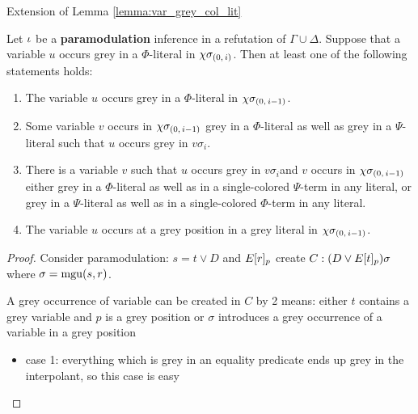 \documentclass[,%
	draft=false,%
	numbers=noendperiod
	12pt,
	a4paper,
	oneside,%
	openany,
]{memoir}
\newcommand{\inv}{\ensuremath{\chi}}
\begin{document}
Extension of Lemma \ref{lemma:var_grey_col_lit}
	
\begin{lemma}
	\label{lemma:var_grey_col_lit_paramod}
	Let $\iota$ be a \textbf{paramodulation} inference in a refutation of $\Gamma\cup\Delta$.
	Suppose that a variable $u$ occurs grey in a $\Phi$-literal in $\inv\sigmazi$.
	Then at least one of the following statements holds:
	\begin{enumerate}
		\item
			\label{11_1}
			The variable $u$ occurs grey in a $\Phi$-literal in $\inv\sigmazmi$.

		\item 
			\label{11_2}
			Some variable $v$ occurs in $\inv\sigmazmi$ grey in a $\Phi$-literal as well as grey in a $\Psi$-literal such that $u$ occurs grey in $v\sigma_i$.

		\item 
			\label{11_3}
			There is a variable $v$ such that $u$ occurs grey in $v\sigma_i$\footnotemark and $v$ occurs in $\inv\sigmazmi$
			either grey in a $\Phi$-literal as well as in a single-colored $\Psi$-term in any literal, 
			or grey in a $\Psi$-literal as well as in a single-colored $\Phi$-term in any literal.

		\item
			\label{11_4}
			The variable $u$ occurs at a grey position in a grey literal in $\inv\sigmazmi$.

	\end{enumerate}
\end{lemma}
\begin{proof}
	Consider paramodulation: $s=t \lor D$ and $E{[r]_{p}}$ create $C: (D\lor E{[t]_{p}})\sigma$ where $\sigma = \operatorname{mgu}(s, r)$.

	A grey occurrence of variable can be created in $C$ by 2 means:
	either $t$ contains a grey variable and $p$ is a grey position or $\sigma$ introduces a grey occurrence of a variable in a grey position

	\begin{itemize}
			\item case 1: 
				everything which is grey in an equality predicate ends up grey in the interpolant, so this case is easy
		\end{itemize}

\end{proof}
\end{document}
